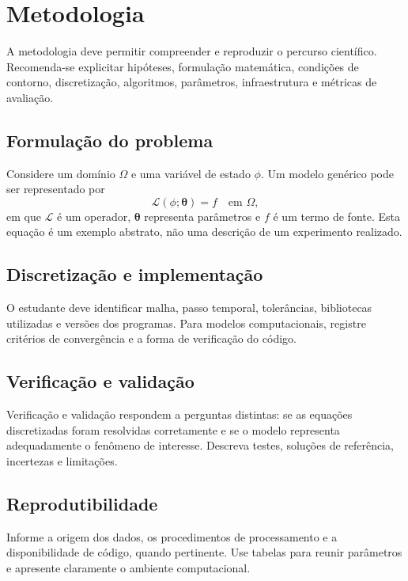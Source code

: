 \chapter{Metodologia}\label{chap:metodologia}
A metodologia deve permitir compreender e reproduzir o percurso científico. Recomenda-se explicitar hipóteses, formulação matemática, condições de contorno, discretização, algoritmos, parâmetros, infraestrutura e métricas de avaliação.

\section{Formulação do problema}
Considere um domínio $\Omega$ e uma variável de estado $\phi$. Um modelo genérico pode ser representado por
\begin{equation}\label{eq:modelo}\mathcal{L}(\phi;\boldsymbol{\theta})=f\quad\text{em }\Omega,\end{equation}
em que $\mathcal{L}$ é um operador, $\boldsymbol{\theta}$ representa parâmetros e $f$ é um termo de fonte. Esta equação é um exemplo abstrato, não uma descrição de um experimento realizado.

\section{Discretização e implementação}
O estudante deve identificar malha, passo temporal, tolerâncias, bibliotecas utilizadas e versões dos programas. Para modelos computacionais, registre critérios de convergência e a forma de verificação do código.

\section{Verificação e validação}
Verificação e validação respondem a perguntas distintas: se as equações discretizadas foram resolvidas corretamente e se o modelo representa adequadamente o fenômeno de interesse. Descreva testes, soluções de referência, incertezas e limitações.

\section{Reprodutibilidade}
Informe a origem dos dados, os procedimentos de processamento e a disponibilidade de código, quando pertinente. Use tabelas para reunir parâmetros e apresente claramente o ambiente computacional.
